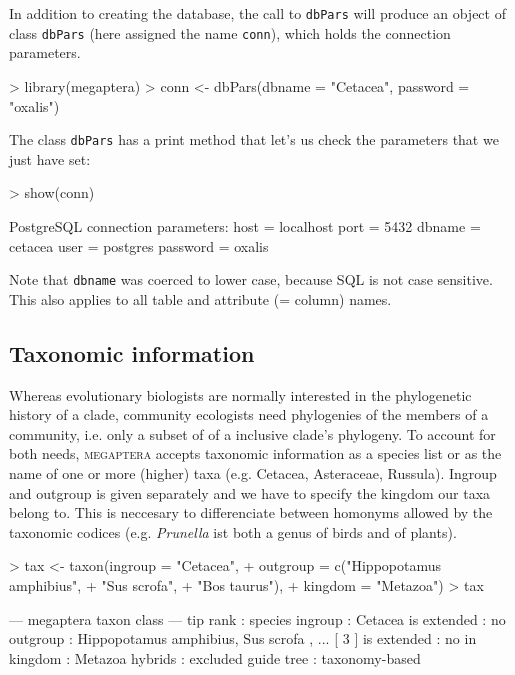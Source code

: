 \documentclass{article}
\begin{document}
In addition to creating the database, the call to \texttt{dbPars} will produce an object of class \texttt{dbPars} (here assigned the name \texttt{conn}), which holds the connection parameters.

\begin{Schunk}
\begin{Sinput}
> library(megaptera)
> conn <- dbPars(dbname = "Cetacea", password = "oxalis")
\end{Sinput}
\end{Schunk}

The class \texttt{dbPars} has a print method that let's us check the parameters that we just have set:

\begin{Schunk}
\begin{Sinput}
> show(conn)
\end{Sinput}
\begin{Soutput}
PostgreSQL connection parameters: 
     host = localhost 
     port = 5432 
   dbname = cetacea 
     user = postgres 
 password = oxalis
\end{Soutput}
\end{Schunk}

Note that \texttt{dbname} was coerced to lower case, because SQL is not case sensitive. This also applies to all table and attribute (= column) names.

\subsection{Taxonomic information}\label{subsec:taxonomy}

Whereas evolutionary biologists are normally interested in the phylogenetic history of a clade, community ecologists need phylogenies of the members of a community, i.e. only a subset of of a inclusive clade's phylogeny. To account for both needs, \textsc{megaptera} accepts taxonomic information as a species list or as the name of one or more (higher) taxa (e.g. Cetacea, Asteraceae, Russula). Ingroup and outgroup is given separately and we have to specify the kingdom our taxa belong to. This is neccesary to differenciate between   homonyms allowed by the taxonomic codices (e.g. \textit{Prunella} ist both a genus of birds and of plants).

\begin{Schunk}
\begin{Sinput}
> tax <- taxon(ingroup = "Cetacea", 
+              outgroup = c("Hippopotamus amphibius", 
+                           "Sus scrofa", 
+                           "Bos taurus"),
+              kingdom = "Metazoa")
> tax
\end{Sinput}
\begin{Soutput}
--- megaptera taxon class ---
tip rank    : species
ingroup     : Cetacea
is extended : no
outgroup    : Hippopotamus amphibius, Sus scrofa , ... [ 3 ]
is extended : no
in kingdom  : Metazoa
hybrids     : excluded
guide tree  : taxonomy-based
\end{Soutput}
\end{Schunk}
\end{document}
